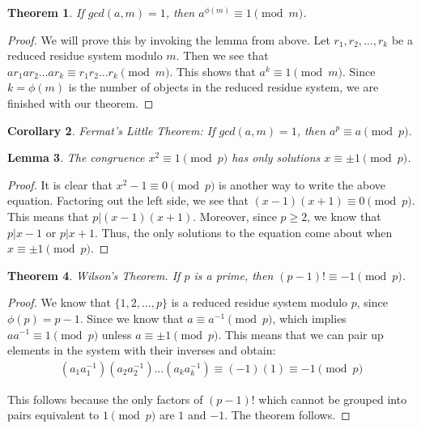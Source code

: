 \documentclass[psamsfonts]{amsart}
\newtheorem{thm}{Theorem}[section]
\newtheorem{cor}[thm]{Corollary}
\newtheorem{lem}[thm]{Lemma}
\theoremstyle{definition}
\theoremstyle{remark}
\numberwithin{equation}{section}
\begin{document}
\begin{thm}
If $gcd(a,m) = 1$, then $a^{\phi(m)} \equiv 1 \pmod{m}$. 
\end{thm}

\begin{proof}
We will prove this by invoking the lemma from above. Let $r_1, r_2, \ldots, r_k$ be a reduced residue system modulo $m$. Then we see that $a r_1  a r_2 \ldots a r_k \equiv r_1 r_2 \ldots r_k \pmod{m}$. This shows that $a^{k} \equiv 1 \pmod{m}$. Since $k = \phi(m)$ is the number of objects in the reduced residue system, we are finished with our theorem.
\end{proof}

\begin{cor}
Fermat's Little Theorem: If $gcd(a,m) = 1$, then $a^p \equiv a \pmod{p}$. 
\end{cor}

\begin{lem}
The congruence $x^2 \equiv 1 \pmod{p}$ has only solutions $x \equiv \pm 1 \pmod{p}$.
\end{lem}

\begin{proof}
It is clear that $x^2 - 1 \equiv 0 \pmod{p}$ is another way to write the above equation. Factoring out the left side, we see that $(x-1)(x+1) \equiv 0 \pmod{p}$. This means that $p | (x-1)(x+1)$. Moreover, since $p \geq 2$, we know that $p | x-1$ or $p | x + 1$. Thus, the only solutions to the equation come about when $x \equiv \pm 1 \pmod{p}$.
\end{proof}

\begin{thm}
Wilson's Theorem. If $p$ is a prime, then $(p-1)! \equiv -1 \pmod{p}$.
\end{thm}

\begin{proof}
We know that $\{1,2,\ldots, p\}$ is a reduced residue system modulo $p$, since $\phi(p) = p-1$. Since we know that $a \equiv a^{-1} \pmod{p}$, which implies $a a^{-1} \equiv 1 \pmod{p}$ unless $a \equiv \pm 1 \pmod{p}$. This means that we can pair up elements in the system with their inverses and obtain:
\begin{eqnarray}
(a_1 a_1^{-1})(a_2 a_2^{-1}) \ldots (a_k a_k^{-1}) \equiv (-1)(1) \equiv -1 \pmod{p}
\end{eqnarray}

This follows because the only factors of $(p-1)!$ which cannot be grouped into pairs equivalent to $1 \pmod{p}$ are $1$ and $-1$. The theorem follows.
\end{proof}
\end{document}
